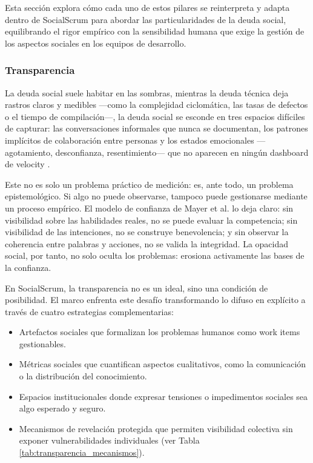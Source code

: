 Esta sección explora cómo cada uno de estos pilares se reinterpreta y adapta dentro de SocialScrum para abordar las particularidades de la deuda social, equilibrando el rigor empírico con la sensibilidad humana que exige la gestión de los aspectos sociales en los equipos de desarrollo.

\subsubsection{Transparencia}

La deuda social suele habitar en las sombras, mientras la deuda técnica deja rastros claros y medibles —como la complejidad ciclomática, las tasas de defectos o el tiempo de compilación—, la deuda social se esconde en tres espacios difíciles de capturar:
las conversaciones informales que nunca se documentan, los patrones implícitos de colaboración entre personas y los estados emocionales —agotamiento, desconfianza, resentimiento— que no aparecen en ningún dashboard de velocity \cite{tamburri2015insights,saeeda2024nontechnicaldebt}.

Este no es solo un problema práctico de medición: es, ante todo, un problema epistemológico.
Si algo no puede observarse, tampoco puede gestionarse mediante un proceso empírico.
El modelo de confianza de Mayer et al. \cite{mayer_integrative_1995} lo deja claro: sin visibilidad sobre las habilidades reales, no se puede evaluar la competencia; sin visibilidad de las intenciones, no se construye benevolencia; y sin observar la coherencia entre palabras y acciones, no se valida la integridad.
La opacidad social, por tanto, no solo oculta los problemas: erosiona activamente las bases de la confianza.

En SocialScrum, la transparencia no es un ideal, sino una condición de posibilidad.
El marco enfrenta este desafío transformando lo difuso en explícito a través de cuatro estrategias complementarias:
\begin{itemize}
    \item Artefactos sociales que formalizan los problemas humanos como work items gestionables.
    \item Métricas sociales que cuantifican aspectos cualitativos, como la comunicación o la distribución del conocimiento.
    \item Espacios institucionales donde expresar tensiones o impedimentos sociales sea algo esperado y seguro.
    \item Mecanismos de revelación protegida que permiten visibilidad colectiva sin exponer vulnerabilidades individuales (ver Tabla \ref{tab:transparencia_mecanismos}).
\end{itemize}

